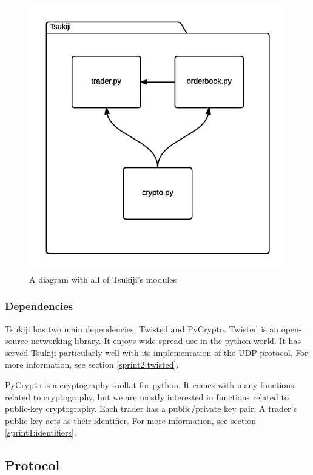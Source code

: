 \begin{figure}
  \centering
  \includegraphics[width=\textwidth]{modules}
  \caption{A diagram with all of Tsukiji's modules}
  \label{modulesfig}
\end{figure}

\subsubsection{Dependencies}
\label{dependencies}
Tsukiji has two main dependencies: Twisted and PyCrypto.
Twisted is an open-source networking library.
It enjoys wide-spread use in the python world.
It has served Tsukiji particularly well with its implementation of the UDP protocol.
For more information, see section \ref{sprint2:twisted}.

PyCrypto is a cryptography toolkit for python.
It comes with many functions related to cryptography, but we are mostly interested in functions related to public-key cryptography.
Each trader has a public/private key pair.
A trader's public key acts as their identifier.
For more information, see section \ref{sprint1:identifiers}.

\subsection{Protocol}
\label{protocol}

